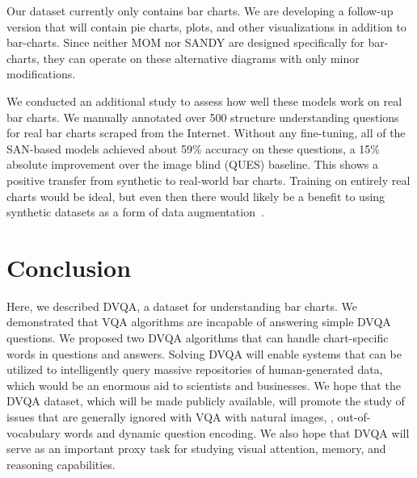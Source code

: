 \documentclass[10pt,twocolumn,letterpaper]{article}
\newcommand{\new}[1]{#1}
\begin{document}
Our dataset currently only contains bar charts. We are developing a follow-up version that will contain pie charts, plots, and other visualizations in addition to bar-charts. Since neither MOM nor SANDY are designed specifically for bar-charts, they can operate on these alternative diagrams with only minor modifications.

\new{
We conducted an additional study to assess how well these models work on real bar charts. We manually annotated over 500 structure understanding questions for real bar charts scraped from the Internet. Without any fine-tuning, all of the SAN-based models achieved about 59\% accuracy on these questions, a 15\% absolute improvement over the image blind (QUES) baseline. This shows a positive transfer from synthetic to real-world bar charts. Training on entirely real charts would be ideal, but even then there would likely be a benefit to using synthetic datasets as a form of data augmentation~\cite{kafle2017data}.}

\section{Conclusion}
Here, we described DVQA, a dataset for understanding bar charts. We demonstrated that VQA algorithms are incapable of answering simple  DVQA questions. We proposed two DVQA algorithms that can handle chart-specific words in questions and answers. Solving DVQA will enable systems that can be utilized to intelligently query massive repositories of human-generated data, which would be an enormous aid to scientists and businesses. We hope that the DVQA dataset, which will be made publicly available, will promote the study of issues that are generally ignored with VQA with natural images, \eg, out-of-vocabulary words and dynamic question encoding. We also hope that DVQA will serve as an important proxy task for studying visual attention, memory, and reasoning capabilities.

{\small


}
\end{document}
